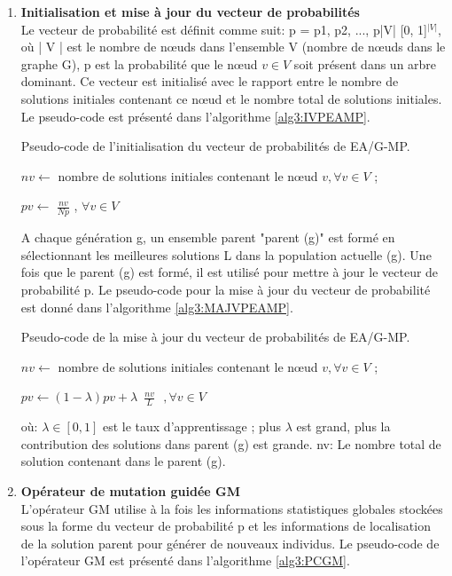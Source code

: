 \begin{enumerate}[label=\alph*)]
	\item \textbf{Initialisation et mise à jour du vecteur de probabilités}\\
	Le vecteur de probabilité est définit comme suit: p = {p1, p2, ..., p|V|} [0, 1]$^{|V|}$, où | V | est le nombre de nœuds dans l'ensemble V (nombre de nœuds dans le graphe G), p est la probabilité que le nœud $v \in V$ soit présent dans un arbre dominant. Ce vecteur est initialisé  avec le rapport entre le nombre de solutions initiales contenant ce nœud et le nombre total de solutions initiales. Le pseudo-code est présenté dans l'algorithme \ref{alg3:IVPEAMP}.
	
\begin{algorithm}[H]
\label{alg3:IVPEAMP}
\caption{Pseudo-code de l'initialisation du vecteur de probabilités de EA/G-MP.}
\SetAlgoLined
\DontPrintSemicolon

$ nv \gets $ nombre de solutions initiales contenant le nœud $v, \forall v \in V$ ;

$ pv \gets$ \( \displaystyle \frac{nv}{Np} \) ,  $\forall v \in V $ \;


\end{algorithm}

A chaque génération g, un ensemble parent "parent (g)" est formé en sélectionnant les meilleures solutions L dans la population actuelle (g). Une fois que le parent (g) est formé, il est utilisé pour mettre à jour le vecteur de probabilité p. Le pseudo-code pour la mise à jour du vecteur de probabilité est donné dans l’algorithme \ref{alg3:MAJVPEAMP}.

\begin{algorithm}[H]
\label{alg3:MAJVPEAMP}
\caption{Pseudo-code de la mise à jour du vecteur de probabilités de EA/G-MP.}
\SetAlgoLined
\DontPrintSemicolon

$ nv \gets $ nombre de solutions initiales contenant le nœud $v, \forall v \in V$ ;

$ pv \gets ( 1 - \lambda ) pv + \lambda \,$ \( \displaystyle \frac{nv}{L} \)  $\, \, , \forall v \in V $ \;

\end{algorithm}	
	
	
où: $\lambda \in [ 0, 1 ] $  est le taux d’apprentissage ; plus $\lambda$ est grand, plus la contribution des solutions dans parent (g) est grande.
nv: Le nombre total de solution contenant dans le parent (g).

	
	\item \textbf{Opérateur de mutation guidée GM}\\
	L'opérateur GM utilise à la fois les informations statistiques globales stockées sous la forme du vecteur de probabilité p et les informations de localisation de la solution parent pour générer de nouveaux individus. Le pseudo-code de l'opérateur GM est présenté dans l'algorithme \ref{alg3:PCGM}.
	

\end{enumerate}
